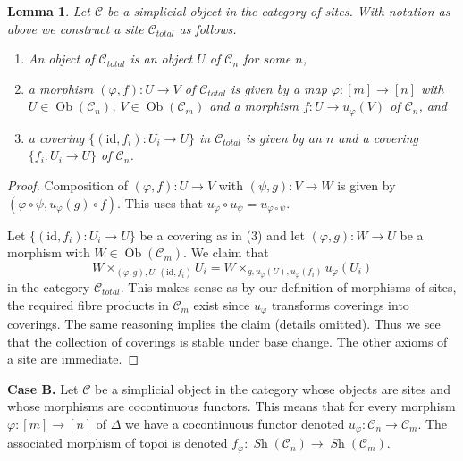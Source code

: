 \documentclass{stacks-project}
\theoremstyle{plain}
\newtheorem{lemma}[subsection]{Lemma}
\theoremstyle{definition}
\theoremstyle{remark}
\numberwithin{equation}{subsection}
\def\Ob{\mathop{\mathrm{Ob}}\nolimits}
\def\Sh{\mathop{\mathit{Sh}}\nolimits}
\begin{document}
\begin{lemma}
\label{lemma-simplicial-site-site}
Let $\mathcal{C}$ be a simplicial object in the category of sites.
With notation as above we construct a site $\mathcal{C}_{total}$ as follows.
\begin{enumerate}
\item An object of $\mathcal{C}_{total}$ is an object $U$ of
$\mathcal{C}_n$ for some $n$,
\item a morphism $(\varphi, f) : U \to V$ of $\mathcal{C}_{total}$
is given by a map $\varphi : [m] \to [n]$ with
$U \in \Ob(\mathcal{C}_n)$, $V \in \Ob(\mathcal{C}_m)$
and a morphism $f : U \to u_\varphi(V)$ of $\mathcal{C}_n$, and
\item a covering $\{(\text{id}, f_i) :  U_i \to U\}$ in $\mathcal{C}_{total}$
is given by an $n$ and a covering $\{f_i : U_i \to U\}$
of $\mathcal{C}_n$.
\end{enumerate}
\end{lemma}

\begin{proof}
Composition of $(\varphi, f) : U \to V$ with $(\psi, g) : V \to W$
is given by $(\varphi \circ \psi, u_\varphi(g) \circ f)$.
This uses that $u_\varphi \circ u_\psi = u_{\varphi \circ \psi}$.

\medskip\noindent
Let $\{(\text{id}, f_i) :  U_i \to U\}$ be a covering as in (3)
and let $(\varphi, g) : W \to U$ be a morphism with
$W \in \Ob(\mathcal{C}_m)$. We claim that
$$
W \times_{(\varphi, g), U, (\text{id}, f_i)} U_i =
W \times_{g, u_\varphi(U), u_\varphi(f_i)} u_\varphi(U_i)
$$
in the category $\mathcal{C}_{total}$. This makes sense as by our
definition of morphisms of sites, the required fibre products
in $\mathcal{C}_m$ exist since $u_\varphi$ transforms coverings into
coverings. The same reasoning implies the claim (details omitted).
Thus we see that the collection of coverings is stable under base
change. The other axioms of a site are immediate.
\end{proof}

\noindent
{\bf Case B.}
Let $\mathcal{C}$ be a simplicial object in the category whose objects are
sites and whose morphisms are cocontinuous functors. This means that for
every morphism $\varphi : [m] \to [n]$ of $\Delta$ we have a cocontinuous
functor denoted $u_\varphi : \mathcal{C}_n \to \mathcal{C}_m$. The associated
morphism of topoi is denoted
$f_\varphi : \Sh(\mathcal{C}_n) \to \Sh(\mathcal{C}_m)$.
\end{document}
